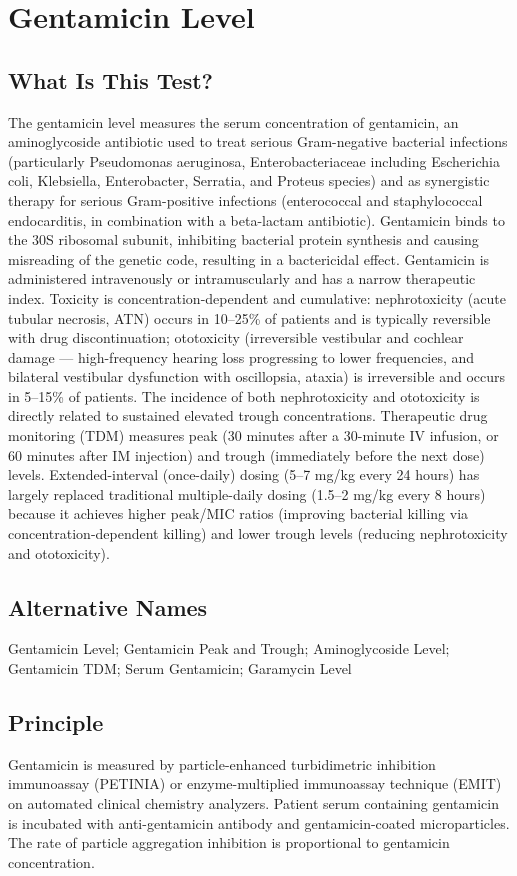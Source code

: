 \chapter{Gentamicin Level}

\section*{What Is This Test?}
The gentamicin level measures the serum concentration of gentamicin, an aminoglycoside antibiotic used to treat serious Gram-negative bacterial infections (particularly Pseudomonas aeruginosa, Enterobacteriaceae including Escherichia coli, Klebsiella, Enterobacter, Serratia, and Proteus species) and as synergistic therapy for serious Gram-positive infections (enterococcal and staphylococcal endocarditis, in combination with a beta-lactam antibiotic). Gentamicin binds to the 30S ribosomal subunit, inhibiting bacterial protein synthesis and causing misreading of the genetic code, resulting in a bactericidal effect. Gentamicin is administered intravenously or intramuscularly and has a narrow therapeutic index. Toxicity is concentration-dependent and cumulative: nephrotoxicity (acute tubular necrosis, ATN) occurs in 10--25\% of patients and is typically reversible with drug discontinuation; ototoxicity (irreversible vestibular and cochlear damage --- high-frequency hearing loss progressing to lower frequencies, and bilateral vestibular dysfunction with oscillopsia, ataxia) is irreversible and occurs in 5--15\% of patients. The incidence of both nephrotoxicity and ototoxicity is directly related to sustained elevated trough concentrations. Therapeutic drug monitoring (TDM) measures peak (30 minutes after a 30-minute IV infusion, or 60 minutes after IM injection) and trough (immediately before the next dose) levels. Extended-interval (once-daily) dosing (5--7 mg/kg every 24 hours) has largely replaced traditional multiple-daily dosing (1.5--2 mg/kg every 8 hours) because it achieves higher peak/MIC ratios (improving bacterial killing via concentration-dependent killing) and lower trough levels (reducing nephrotoxicity and ototoxicity).

\section*{Alternative Names}
Gentamicin Level; Gentamicin Peak and Trough; Aminoglycoside Level; Gentamicin TDM; Serum Gentamicin; Garamycin Level

\section*{Principle}
Gentamicin is measured by particle-enhanced turbidimetric inhibition immunoassay (PETINIA) or enzyme-multiplied immunoassay technique (EMIT) on automated clinical chemistry analyzers. Patient serum containing gentamicin is incubated with anti-gentamicin antibody and gentamicin-coated microparticles. The rate of particle aggregation inhibition is proportional to gentamicin concentration.

